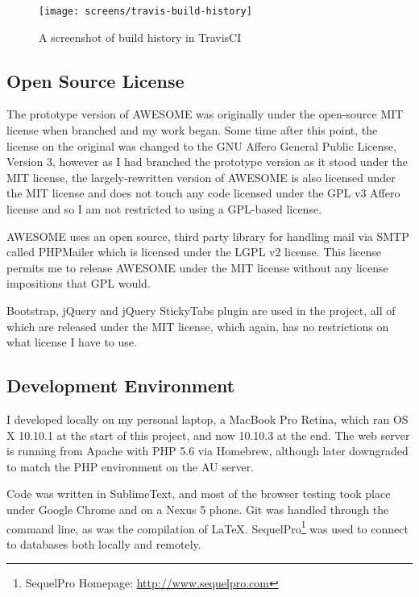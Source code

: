 	\begin{figure}[H]
		\centering \texttt{[image: screens/travis-build-history]}
		\caption{A screenshot of build history in TravisCI}
		\label{fig:travisbuildhistory}
	\end{figure}
	
	
	\subsection{Open Source License}
	\label{ssec:license}
	
	The prototype version of \ac{AWESOME} was originally under the open-source MIT license\cite{mitlicense} when branched and my work began.
	Some time after this point, the license on the original was changed to the GNU Affero General Public License, Version 3\cite{gplv3afferolicense}, however as I had branched the prototype version as it stood under the MIT license, the largely-rewritten version of \ac{AWESOME} is also licensed under the MIT license and does not touch any code licensed under the GPL v3 Affero license and so I am not restricted to using a GPL-based license.
	
	\ac{AWESOME} uses an open source, third party library for handling mail via SMTP called PHPMailer\cite{phpmailer} which is licensed under the LGPL v2 license.
	This license permits me to release \ac{AWESOME} under the MIT license without any license impositions that GPL would.
	
	Bootstrap, jQuery and jQuery StickyTabs plugin are used in the project, all of which are released under the MIT license, which again, has no restrictions on what license I have to use.
	
	\subsection{Development Environment}
	\label{ssec:devenvironment}
	
	I developed locally on my personal laptop, a MacBook Pro Retina, which ran OS X 10.10.1 at the start of this project, and now 10.10.3 at the end.
	The web server is running from Apache with PHP 5.6 via Homebrew, although later downgraded to match the PHP environment on the \ac{AU} server.
	
	Code was written in SublimeText, and most of the browser testing took place under Google Chrome and on a Nexus 5 phone.
	Git was handled through the command line, as was the compilation of \LaTeX.
	SequelPro\footnote{SequelPro Homepage: \url{http://www.sequelpro.com}} was used to connect to databases both locally and remotely.
	
